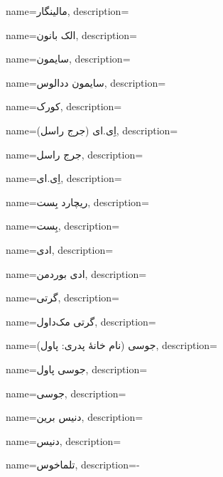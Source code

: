 {
name={مالینگار},
description={}
}

{
name={الک بانون},
description={}
}

{
name={سایمون},
description={}
}

{
name={سایمون ددالوس},
description={}
}

{
name={کورک},
description={}
}

{
name={اِی.ای (جرج راسل)},
description={}
}

{
name={جرج راسل},
description={}
}

{
name={اِی.ای},
description={}
}

{
name={ریچارد بِست},
description={}
}

{
name={بِست},
description={}
}

{
name={ادی},
description={}
}

{
name={ادی بوردمن},
description={}
}

{
name={گرتی},
description={}
}

{
name={گرتی مک‌داول},
description={}
}

{
name={جوسی (نام خانۀ پدری: پاول)},
description={}
}

{
name={جوسی پاول},
description={}
}

{
name={جوسی},
description={}
}

{
name={دنیس برین},
description={}
}

{
name={دنیس},
description={}
}

{
name={تلماخوس},
description={-}
}